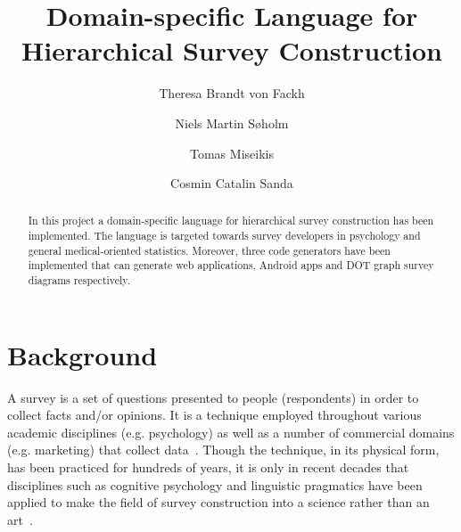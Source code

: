 \documentclass[runningheads,a4paper]{llncs}
\begin{document}
\mainmatter  %
\title{Domain-specific Language for Hierarchical Survey Construction}


%
%
\author{Theresa Brandt von Fackh\and Niels Martin S{\o}holm\and Tomas Miseikis\and Cosmin Catalin Sanda}
%


%
%

\maketitle

\begin{abstract}
In this project a domain-specific language for hierarchical survey construction has been implemented. The language is targeted towards survey developers in psychology and general medical-oriented statistics. Moreover, three code generators have been implemented that can generate web applications, Android apps and DOT graph survey diagrams respectively.
\end{abstract}

\section{Background}
\label{sec:background}
A survey is a set of questions presented to people (respondents) in order to collect facts and/or opinions. It is a technique employed throughout various academic disciplines (e.g. psychology) as well as a number of commercial domains (e.g. marketing) that collect data~\cite{synodinos}. Though the technique, in its physical form, has been practiced for hundreds of years, it is only in recent decades that disciplines such as cognitive psychology and linguistic pragmatics have been applied to make the field of survey construction into a science rather than an art~\cite{martin}.
\end{document}
